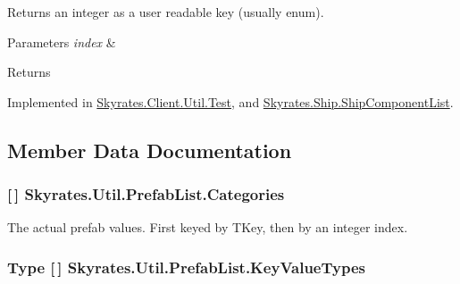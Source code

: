 Returns an integer as a user readable key (usually enum). 


\begin{DoxyParams}{Parameters}
{\em index} & \\
\hline
\end{DoxyParams}
\begin{DoxyReturn}{Returns}

\end{DoxyReturn}


Implemented in \hyperlink{class_skyrates_1_1_client_1_1_util_1_1_test_a6dfcf2dbe2aa97e9f193c09085a86d75}{Skyrates.\-Client.\-Util.\-Test}, and \hyperlink{class_skyrates_1_1_ship_1_1_ship_component_list_a203816146c8f0f45891760cc44fd9734}{Skyrates.\-Ship.\-Ship\-Component\-List}.



\subsection{Member Data Documentation}
\hypertarget{class_skyrates_1_1_util_1_1_prefab_list_abd1410aa765b2219337b60dab32083cb}{
\subsubsection[{Categories}]{ \mbox{[}$\,$\mbox{]} Skyrates.\-Util.\-Prefab\-List.\-Categories}}\label{class_skyrates_1_1_util_1_1_prefab_list_abd1410aa765b2219337b60dab32083cb}


The actual prefab values. First keyed by T\-Key, then by an integer index. 

\hypertarget{class_skyrates_1_1_util_1_1_prefab_list_adc9cd42231d5f2232f8e71cd0ab0dd56}{
\subsubsection[{Key\-Value\-Types}]{\setlength{\rightskip}{0pt plus 5cm}Type \mbox{[}$\,$\mbox{]} Skyrates.\-Util.\-Prefab\-List.\-Key\-Value\-Types}}\label{class_skyrates_1_1_util_1_1_prefab_list_adc9cd42231d5f2232f8e71cd0ab0dd56}



